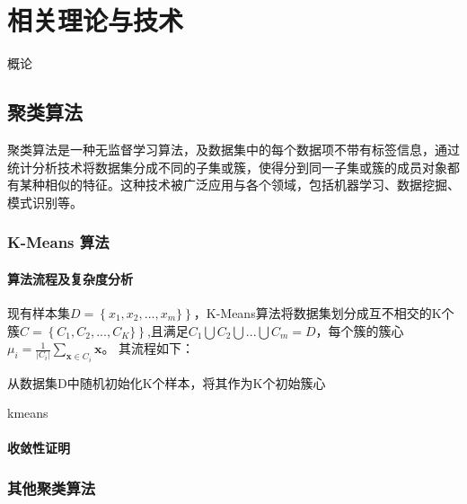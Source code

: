 \chapter{相关理论与技术}
概论

\section{聚类算法}
聚类算法是一种无监督学习算法，及数据集中的每个数据项不带有标签信息，通过统计分析技术将数据集分成不同的子集或簇，使得分到同一子集或簇的成员对象都有某种相似的特征。这种技术被广泛应用与各个领域，包括机器学习、数据挖掘、模式识别等。

\subsection{K-Means 算法}

\subsubsection{算法流程及复杂度分析}
现有样本集$D=\left\{x_1,x_2,...,x_m\}\right\}$，K-Means算法将数据集划分成互不相交的K个簇$C=\left\{C_1,C_2,...,C_K\}\right\}$,且满足$C_1\bigcup{C_2\bigcup{...\bigcup{C_m=D}}}$，每个簇的簇心$\mu _i=\frac{1}{|C_i|}\sum_{\mathbf{x}\in C_i}{\mathbf{x}}$。
其流程如下：
\begin{algorithm}[H]
	 从数据集D中随机初始化K个样本，将其作为K个初始簇心\;
	 \caption{kmeans}
\end{algorithm}

\subsubsection{收敛性证明}

\subsection{其他聚类算法}

